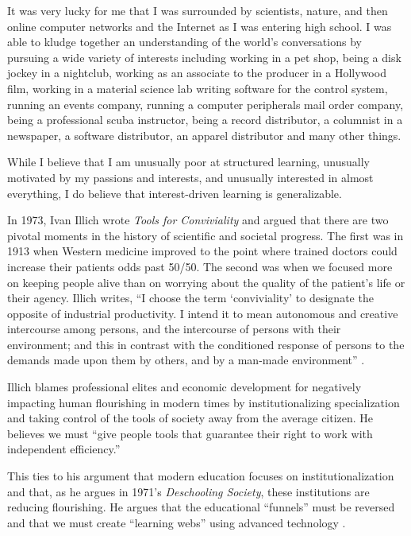 It was very lucky for me that I was surrounded by scientists, nature, and then online computer networks and the Internet as I was entering high school. I was able to kludge together an understanding of the world's conversations by pursuing a wide variety of interests including working in a pet shop, being a disk jockey in a nightclub, working as an associate to the producer in a Hollywood film, working in a material science lab writing software for the control system, running an events company, running a computer peripherals mail order company, being a professional scuba instructor, being a record distributor, a columnist in a newspaper, a software distributor, an apparel distributor and many other things.

While I believe that I am unusually poor at structured learning, unusually motivated by my passions and interests, and unusually interested in almost everything, I do believe that interest-driven learning is generalizable.

In 1973, Ivan Illich wrote \emph{Tools for Conviviality} and argued that there are two pivotal moments in the history of scientific and societal progress. The first was in 1913 when Western medicine improved to the point where trained doctors could increase their patients odds past 50/50. The second was when we focused more on keeping people alive than on worrying about the quality of the patient's life or their agency. Illich writes, ``I choose the term `conviviality' to designate the opposite of industrial productivity. I intend it to mean autonomous and creative intercourse among persons, and the intercourse of persons with their environment; and this in contrast with the conditioned response of persons to the demands made upon them by others, and by a man-made environment'' \cite{Illich:1973aa}.

Illich blames professional elites and economic development for negatively impacting human flourishing in modern times by institutionalizing specialization and taking control of the tools of society away from the average citizen. He believes we must ``give people tools that guarantee their right to work with independent efficiency.''

This ties to his argument that modern education focuses on institutionalization and that, as he argues in 1971's \emph{Deschooling Society}, these institutions are reducing flourishing. He argues that the educational ``funnels'' must be reversed and that we must create ``learning webs'' using advanced technology \cite{Illich:1971aa}.

